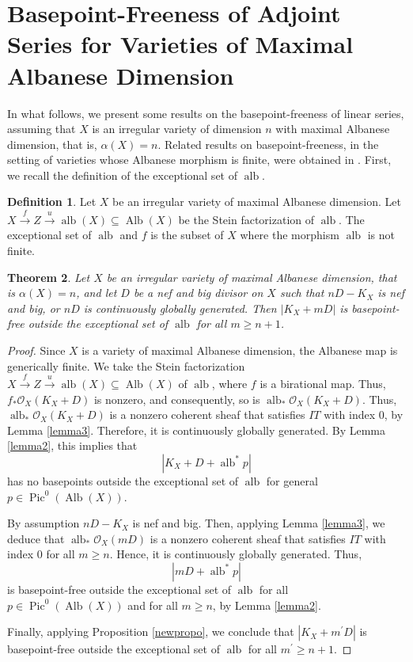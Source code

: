 \documentclass[sn-mathphys-num]{sn-jnl}%
\newtheorem{theorem}{Theorem}[section]
\theoremstyle{definition}
\newtheorem{defn}[theorem]{Definition}
\numberwithin{equation}{section}
\begin{document}
\section{Basepoint-Freeness of Adjoint Series for Varieties of Maximal Albanese Dimension}
In what follows, we present some results on the basepoint-freeness of linear series, assuming that $X$ is an irregular variety of dimension $n$ with maximal Albanese dimension, that is, $\alpha(X) = n$. Related results on basepoint-freeness, in the setting of varieties whose Albanese morphism is finite, were obtained in \cite[Theorem 5.1]{popapareschi1}. First, we recall the definition of the exceptional set of $\operatorname{alb}$.
\begin{defn}
Let $X$ be an irregular variety of maximal Albanese dimension. Let $X \xrightarrow{f} Z \xrightarrow{u} \operatorname{alb}(X) \subseteq \operatorname{Alb}(X)$ be the Stein factorization of $\operatorname{alb}$. The exceptional set of $\operatorname{alb}$ and $f$ is the subset of $X$ where the morphism $\operatorname{alb}$ is not finite.
\end{defn}
\begin{theorem}\label{mainresult3}
    Let $X$ be an irregular  variety of maximal Albanese dimension, that is $\alpha(X) = n$, and let $D$ be a nef and big divisor on $X$ such that $nD - K_{X}$ is nef and big, or $nD$ is continuously globally generated. Then $|K_{X} + mD|$ is basepoint-free outside the exceptional set of $\operatorname{alb}$ for all $m \geq n+1$. 
\end{theorem}
\begin{proof}Since $X$ is a variety of maximal Albanese dimension, the Albanese map is generically finite. We take the Stein factorization $X \xrightarrow{f} Z \xrightarrow{u} \operatorname{alb}(X) \subseteq \operatorname{Alb}(X)$ of $\operatorname{alb}$, where $f$ is a birational map. Thus, $f_{*}\mathcal{O}_{X}(K_{X} +D)$ is nonzero, and consequently, so is $\operatorname{alb}_{*}\mathcal{O}_{X}(K_{X} + D)$. Thus, $\operatorname{alb}_{*}\mathcal{O}_{X}(K_{X} + D)$ is a nonzero coherent sheaf that satisfies $IT$ with index $0$, by Lemma \ref{lemma3}. Therefore, it is continuously globally generated. By Lemma \ref{lemma2}, this implies that $$|K_{X} + D + \operatorname{alb}^{*}p|$$ has no basepoints outside the exceptional set of $\operatorname{alb}$ for general $p \in \operatorname{Pic}^{0}(\operatorname{Alb}(X))$.

\par By assumption $nD - K_{X}$ is nef and big. Then,  applying Lemma \ref{lemma3}, we deduce that $\operatorname{alb}_{*}\mathcal{O}_{X}(mD)$ is a nonzero coherent sheaf that satisfies  $IT$ with index $0$ for all $m \geq n$. Hence, it is continuously globally generated. Thus, $$|mD + \operatorname{alb}^{*}p|$$ is basepoint-free outside the exceptional set of $\operatorname{alb}$ for all $p \in \operatorname{Pic}^{0}(\operatorname{Alb}(X))$ and for all $m \geq n$, by Lemma \ref{lemma2}. 
\par Finally, applying Proposition \ref{newpropo}, we conclude that $|K_{X} + m^{'}D|$ is basepoint-free outside the exceptional set of $\operatorname{alb}$ for all $m^{'} \geq n+1$. 
\end{proof}
\end{document}
